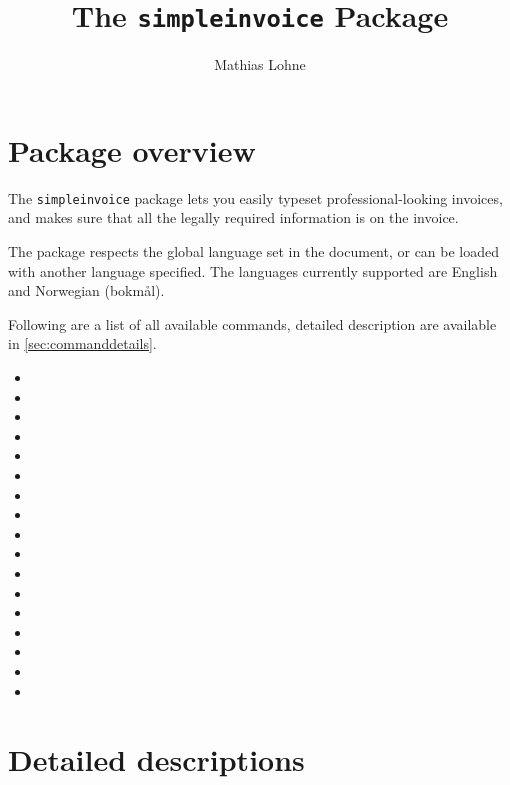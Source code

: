 \documentclass[a4paper, article, oneside, USenglish, hidelinks]{memoir}
\title{The \texttt{simpleinvoice} Package}
\author{Mathias Lohne}
\date{}
\begin{document}
\maketitle

\tableofcontents

\newpage
\chapter{Package overview}
The \texttt{simpleinvoice} package lets you easily typeset professional-looking invoices, and makes sure that all the legally required information is on the invoice. 

The package respects the global language set in the document, or can be loaded with another language specified. The languages currently supported are English and Norwegian (bokmål).


Following are a list of all available commands, detailed description are available in \cref{sec:commanddetails}.

\begin{itemize}
	\item {}
	\item {}
	\item {}
	\item {}
	\item {}
	\item {}
	\item {}
	\item {}
	\item {}
	\item {}
	\item {}
	\item {}
	\item {}
	\item {}
	\item {}
	\item {}
	\item {}
\end{itemize}


\newpage
\chapter{Detailed descriptions}
\end{document}
